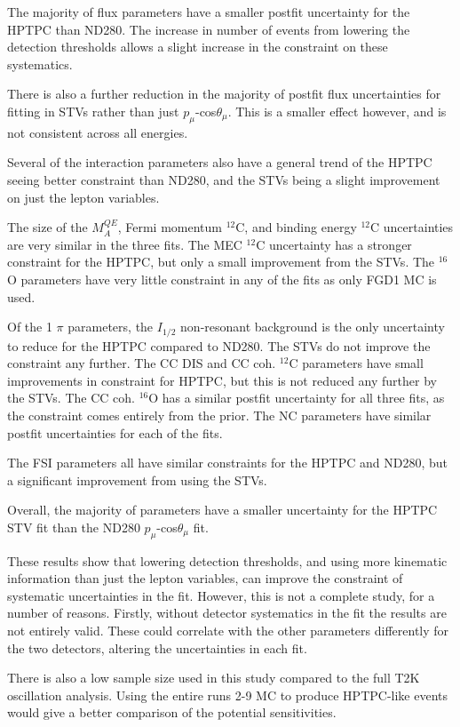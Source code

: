 The majority of flux parameters have a smaller postfit uncertainty for the HPTPC than ND280. The increase in number of events from lowering the detection thresholds allows a slight increase in the constraint on these systematics.

There is also a further reduction in the majority of postfit flux uncertainties for fitting in STVs rather than just $p_{\mu}$-cos$\theta_{\mu}$. This is a smaller effect however, and is not consistent across all energies.

Several of the interaction parameters also have a general trend of the HPTPC seeing better constraint than ND280, and the STVs being a slight improvement on just the lepton variables.

The size of the $M_{A}^{QE}$, Fermi momentum $^{12}$C, and binding energy $^{12}$C uncertainties are very similar in the three fits. The MEC $^{12}$C uncertainty has a stronger constraint for the HPTPC, but only a small improvement from the STVs. The $^{16}$O parameters have very little constraint in any of the fits as only FGD1 MC is used. 

Of the 1 $\pi$ parameters, the $I_{1/2}$ non-resonant background is the only uncertainty to reduce for the HPTPC compared to ND280. The STVs do not improve the constraint any further. The CC DIS and CC coh. $^{12}$C parameters have small improvements in constraint for HPTPC, but this is not reduced any further by the STVs. The CC coh. $^{16}$O has a similar postfit uncertainty for all three fits, as the constraint comes entirely from the prior. The NC parameters have similar postfit uncertainties for each of the fits.

The FSI parameters all have similar constraints for the HPTPC and ND280, but a significant improvement from using the STVs.

Overall, the majority of parameters have a smaller uncertainty for the HPTPC STV fit than the ND280 $p_{\mu}$-cos$\theta_{\mu}$ fit.

These results show that lowering detection thresholds, and using more kinematic information than just the lepton variables, can improve the constraint of systematic uncertainties in the fit. However, this is not a complete study, for a number of reasons. Firstly, without detector systematics in the fit the results are not entirely valid. These could correlate with the other parameters differently for the two detectors, altering the uncertainties in each fit.

There is also a low sample size used in this study compared to the full T2K oscillation analysis. Using the entire runs 2-9 MC to produce HPTPC-like events would give a better comparison of the potential sensitivities.

